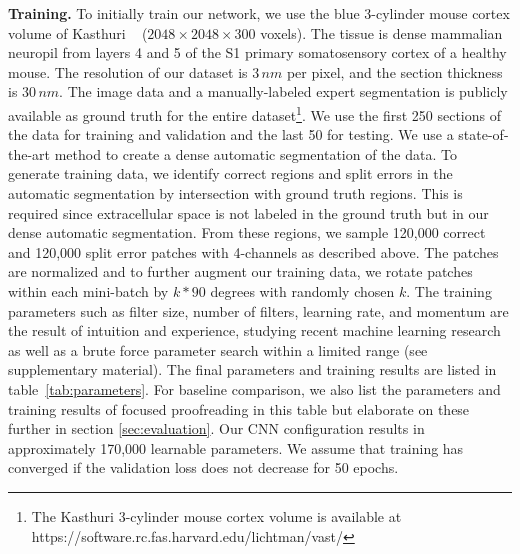 \textbf{Training.} To initially train our network, we use the blue 3-cylinder mouse cortex volume of Kasthuri \etal~\cite{kasthuri2015saturated} ($2048\times2048\times300$ voxels). The tissue is dense mammalian neuropil from layers 4 and 5 of the S1 primary somatosensory cortex of a healthy mouse. The resolution of our dataset is $3\, nm$ per pixel, and the section thickness is $30\, nm$. The image data and a manually-labeled expert segmentation is publicly available as ground truth for the entire dataset\footnote{The Kasthuri 3-cylinder mouse cortex volume is available at  https://software.rc.fas.harvard.edu/lichtman/vast/}. We use the first 250 sections of the data for training and validation and the last 50 for testing. We use a state-of-the-art method to create a dense automatic segmentation of the data. To generate training data, we identify correct regions and split errors in the automatic segmentation by intersection with ground truth regions. This is required since extracellular space is not labeled in the ground truth but in our dense automatic segmentation. From these regions, we sample 120,000 correct and 120,000 split error patches with 4-channels as described above. The patches are normalized and to further augment our training data, we rotate patches within each mini-batch by $k*90$ degrees with randomly chosen $k$. The training parameters such as filter size, number of filters, learning rate, and momentum are the result of intuition and experience, studying recent machine learning research as well as a brute force parameter search within a limited range (see supplementary material). The final parameters and training results are listed in table~\ref{tab:parameters}. For baseline comparison, we also list the parameters and training results of focused proofreading in this table but elaborate on these further in section \ref{sec:evaluation}. Our CNN configuration results in approximately 170,000 learnable parameters. We assume that training has converged if the validation loss does not decrease for 50 epochs.

